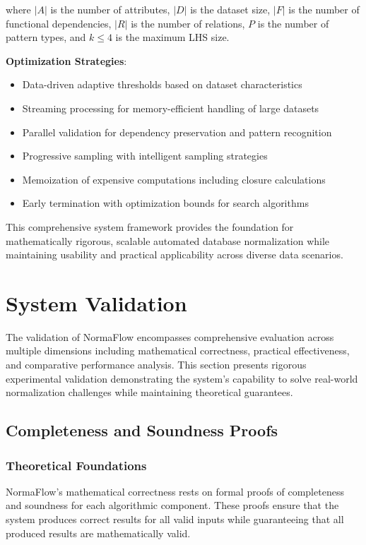 \documentclass[acmsmall]{acmart}
\begin{document}
where $|A|$ is the number of attributes, $|D|$ is the dataset size, $|F|$ is the number of functional dependencies, $|R|$ is the number of relations, $P$ is the number of pattern types, and $k \leq 4$ is the maximum LHS size.

\textbf{Optimization Strategies}:
\begin{itemize}
\item Data-driven adaptive thresholds based on dataset characteristics
\item Streaming processing for memory-efficient handling of large datasets
\item Parallel validation for dependency preservation and pattern recognition
\item Progressive sampling with intelligent sampling strategies
\item Memoization of expensive computations including closure calculations
\item Early termination with optimization bounds for search algorithms
\end{itemize}

This comprehensive system framework provides the foundation for mathematically rigorous, scalable automated database normalization while maintaining usability and practical applicability across diverse data scenarios.

\section{System Validation}

The validation of NormaFlow encompasses comprehensive evaluation across multiple dimensions including mathematical correctness, practical effectiveness, and comparative performance analysis. This section presents rigorous experimental validation demonstrating the system's capability to solve real-world normalization challenges while maintaining theoretical guarantees.

\subsection{Completeness and Soundness Proofs}

\subsubsection{Theoretical Foundations}

NormaFlow's mathematical correctness rests on formal proofs of completeness and soundness for each algorithmic component. These proofs ensure that the system produces correct results for all valid inputs while guaranteeing that all produced results are mathematically valid.
\end{document}

